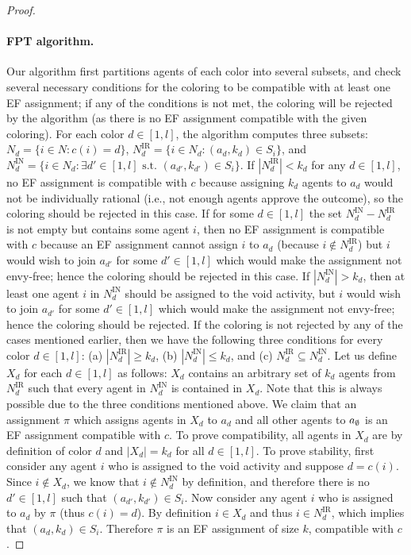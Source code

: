 \begin{proof}
\paragraph{FPT algorithm.}
Our algorithm first partitions agents of each color into several subsets, and check several necessary conditions for the coloring to be compatible with at least one EF assignment; if any of the conditions is not met, the coloring will be rejected by the algorithm (as there is no EF assignment compatible with the given coloring). 
For each color $d\in [1, l]$, the algorithm computes three subsets: $N_d = \{i \in N : c(i) = d\}$,
 $N^{\text{IR}}_d = \{i \in N_d : (a_d, k_d) \in S_i \}$, and
 $N^{\text{IN}}_d = \{i \in N_d : \exists d'\in[1, l] \text{~s.t.~} (a_{d'}, k_{d'}) \in S_i\}$.
If $|N^{\text{IR}}_d| < k_d$ for any $d\in [1, l]$, no EF assignment is compatible with $c$ because assigning $k_d$ agents to $a_d$ would not be individually rational (i.e., not enough agents approve the outcome), so the coloring should be rejected in this case.
If for some $d \in [1, l]$ the set $N^{\text{IN}}_d - N^{\text{IR}}_d$ is not empty but contains some agent $i$, then no EF assignment is compatible with $c$ because an EF assignment cannot assign $i$ to $a_d$ (because $i\not\in N^{\text{IR}}_d$) but $i$ would wish to join $a_{d'}$ for some $d'\in [1, l]$ which would make the assignment not envy-free; hence the coloring should be rejected in this case. 
If $|N^{\text{IN}}_d| > k_d$, then at least one agent $i$ in $N^{\text{IN}}_d$ should be assigned to the void activity, but $i$ would wish to join $a_{d'}$ for some $d'\in[1, l]$ which would make the assignment not envy-free; hence the coloring should be rejected.
If the coloring is not rejected by any of the cases mentioned earlier, then we have the following three conditions for every color $d\in [1, l]$: (a) $|N^{\text{IR}}_d| \geq k_d$, (b) $|N^{\text{IN}}_d| \leq k_d$, and (c) $N^{\text{IR}}_d \subseteq N^{\text{IN}}_d$.
Let us define $X_d$ for each $d\in [1, l]$ as follows: $X_d$ contains an arbitrary set of $k_d$ agents from $N^{\text{IR}}_d$ such that every agent in $N^{\text{IN}}_d$ is contained in $X_d$. Note that this is always possible due to the three conditions mentioned above. 
We claim that an assignment $\pi$ which assigns agents in $X_d$ to $a_d$ and all other agents to $a_{\emptyset}$ is an EF assignment compatible with $c$. To prove compatibility, all agents in $X_d$ are by definition of color $d$ and $|X_d| = k_d$ for all $d\in [1, l]$.
To prove stability, first consider any agent $i$ who is assigned to the void activity and suppose $d = c(i)$. Since $i\not\in X_d$, we know that $i\not\in N^{\text{IN}}_d$ by definition, and therefore there is no $d'\in[1,l]$ such that $(a_{d'}, k_{d'})\in S_i$. Now consider any agent $i$ who is assigned to $a_d$ by $\pi$ (thus $c(i) = d$). By definition $i\in X_d$ and thus $i\in N^{\text{IR}}_d$, which implies that $(a_d, k_d)\in S_i$. Therefore $\pi$ is an EF assignment of size $k$, compatible with $c$. 


\end{proof}
